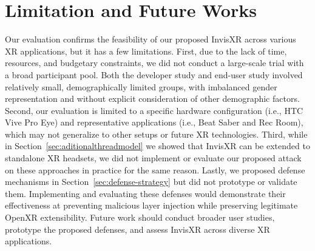 \documentclass[letterpaper,twocolumn,10pt]{article}
\begin{document}
\section{Limitation and Future Works}
Our evaluation confirms the feasibility of our proposed InvisXR across various XR applications, but it has a few limitations. First, due to the lack of time, resources, and budgetary constraints, we did not conduct a large-scale trial with a broad participant pool. Both the developer study and end-user study involved relatively small, demographically limited groups, with imbalanced gender representation and without explicit consideration of other demographic factors. Second, our evaluation is limited to a specific hardware configuration (i.e., HTC Vive Pro Eye) and representative applications (i.e., Beat Saber and Rec Room), which may not generalize to other setups or future XR technologies. Third, while in Section~\ref{sec:aditionalthreadmodel} we showed that InvisXR can be extended to standalone XR headsets, we did not implement or evaluate our proposed attack on these approaches in practice for the same reason. Lastly, we proposed defense mechanisms in Section~\ref{sec:defense-strategy} but did not prototype or validate them. Implementing and evaluating these defenses would demonstrate their effectiveness at preventing malicious layer injection while preserving legitimate OpenXR extensibility. Future work should conduct broader user studies, prototype the proposed defenses, and assess InvisXR across diverse XR applications.
\end{document}
